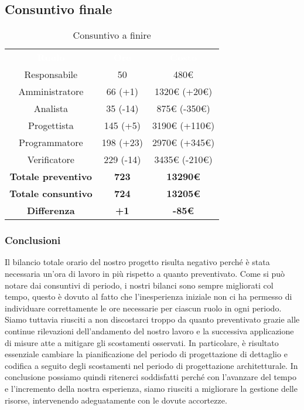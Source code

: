 \subsection{Consuntivo finale}
\begin{table}[H]
\centering\renewcommand{\arraystretch}{1.5}
\caption{Consuntivo a finire}
\vspace{0.2cm}
\begin{tabular}{ c c c }
\rowcolor{redafk}
\textcolor{white}{\textbf{Ruolo}} & \textcolor{white}{\textbf{Ore}} &
\textcolor{white}{\textbf{Costo}}  \\
Responsabile 	& 50 & 480€ \\
Amministratore 	& 66 (+1)  & 1320€ (+20€)\\
Analista 		&  35 (-14) & 875€ (-350€) \\
Progettista		&  145 (+5) & 3190€ (+110€) \\
Programmatore	&  198 (+23) & 2970€ (+345€) \\
Verificatore 	&  229 (-14) & 3435€ (-210€) \\
\textbf{Totale preventivo} & \textbf{723} & \textbf{13290€}  \\
\textbf{Totale consuntivo} &  \textbf{724}& \textbf{13205€} \\
\rowcolor{lastrowcolor}
\textbf{Differenza} & \textbf{+1} & \textbf{-85€} \\
\end{tabular}
\end{table}

\subsubsection{Conclusioni}
Il bilancio totale orario del nostro progetto risulta negativo perché è stata
necessaria un’ora di lavoro in più rispetto a quanto preventivato.
Come si può notare dai consuntivi di periodo, i nostri bilanci sono sempre
migliorati col tempo, questo è dovuto al fatto che l’inesperienza iniziale non
ci ha permesso di individuare correttamente le ore necessarie per ciascun
ruolo in ogni periodo. Siamo tuttavia riusciti a non discostarci troppo da
quanto preventivato grazie alle continue rilevazioni dell’andamento del nostro
lavoro e la successiva applicazione di misure atte a mitigare gli scostamenti
osservati. In particolare, è risultato essenziale cambiare la pianificazione del
periodo di progettazione di dettaglio e codifica a seguito degli scostamenti
nel periodo di progettazione architetturale.
In conclusione possiamo quindi ritenerci soddisfatti perché con l’avanzare del tempo e l’incremento della nostra esperienza, siamo riusciti a migliorare la gestione delle risorse, intervenendo adeguatamente con le dovute accortezze.


